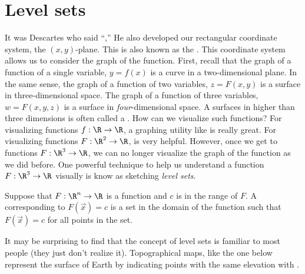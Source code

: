 \documentclass{ximera}
\begin{document}
\section{Level sets}

It was Descartes who said ``,'' He also
developed our rectangular coordinate system, the $(x,y)$-plane. This
is also known as the .
This coordinate system allows us to consider the graph of the
function. First, recall that the graph of a function of a single
variable, $y=f(x)$ is a curve in a two-dimensional plane.  In the same
sense, the graph of a function of two variables, $z = F(x,y)$ is a
surface in three-dimensional space. The graph of a function of three
variables, $w=F(x,y,z)$ is a surface in \textit{four}-dimensional
space. A surfaces in higher than three dimensions is often called a
. How can we visualize such functions?  For
visualizing functions $f:\R\to\R$, a graphing utility like
 is really great. For
visualizing functions $F:\R^2\to\R$,
 is very
helpful. However, once we get to functions $F:\R^3\to\R$, we can no
longer visualize the graph of the function as we did before.  One
powerful technique to help us understand a function $F:\R^3\to\R$
visually is know as sketching \textit{level sets}.


\begin{definition}
  Suppose that $F:\R^n \to \R$ is a function and $c$ is in the range
  of $F$. A  corresponding to $F(\vec{x})=c$ is a set
  in the domain of the function such that $F(\vec{x}) = c$ for all
  points in the set.
\end{definition}



It may be surprising to find that the concept of level sets is
familiar to most people (they just don't realize it).  Topographical
maps, like the one below represent the surface of Earth by
indicating points with the same elevation with .
\end{document}
